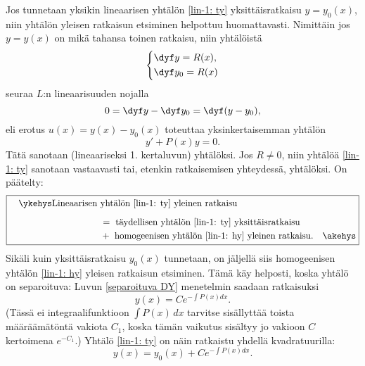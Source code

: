 Jos tunnetaan yksikin lineaarisen yhtälön \eqref{lin-1: ty} yksittäisratkaisu $y=y_0(x)$, niin
yhtälön yleisen ratkaisun etsiminen helpottuu huomattavasti. Nimittäin jos $y=y(x)$ on mikä
tahansa toinen ratkaisu, niin yhtälöistä
\[
\left\{ \begin{aligned}
&\dyf y = R(x), \\
&\dyf y_0 = R(x)
\end{aligned} \right.
\]
seuraa $L$:n lineaarisuuden nojalla
\[
0=\dyf y - \dyf y_0 = \dyf(y-y_0),
\]
eli erotus $u(x)=y(x)-y_0(x)$ toteuttaa yksinkertaisemman yhtälön
\begin{equation} \label{lin-1: hy}
y'+P(x)y=0.
\end{equation}
Tätä sanotaan (lineaariseksi 1. kertaluvun) 
%
 yhtälöksi. Jos $R \neq 0$, niin
%
yhtälöä \eqref{lin-1: ty} sanotaan vastaavasti  tai, etenkin 
ratkaisemisen yhteydessä,  yhtälöksi. On päätelty:
\[
\boxed{\begin{aligned}
\quad\ykehys \text{Lineaarisen}\ 
            &\text{yhtälön \eqref{lin-1: ty} yleinen ratkaisu} \\[2mm]
            &= \ \text{täydellisen yhtälön \eqref{lin-1: ty} yksittäisratkaisu} \\
            &+ \ \text{homogeenisen yhtälön \eqref{lin-1: hy} yleinen ratkaisu}. \quad\akehys
\end{aligned}}
\]
Sikäli kuin yksittäisratkaisu $y_0(x)$ tunnetaan, on jäljellä siis homogeenisen yhtälön
\eqref{lin-1: hy} yleisen ratkaisun etsiminen. Tämä käy helposti, koska yhtälö on separoituva:
Luvun \ref{separoituva DY} menetelmin saadaan ratkaisuksi
\[
y(x)=Ce^{-\int P(x)dx}.
\]
(Tässä ei integraalifunktioon $\int P(x)\,dx$ tarvitse sisällyttää toista määräämätöntä
vakiota $C_1$, koska tämän vaikutus sisältyy jo vakioon $C$ kertoimena $e^{-C_1}$.) Yhtälö
\eqref{lin-1: ty} on näin ratkaistu yhdellä kvadratuurilla:
\[
y(x)=y_0(x)+Ce^{-\int P(x)dx}.
\]

